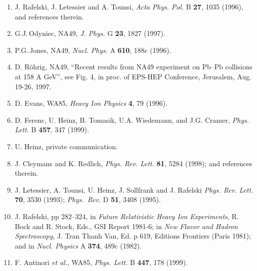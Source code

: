 \begin{mdframed}[linecolor=gray,roundcorner=12pt,backgroundcolor=Dandelion!15,linewidth=1pt,leftmargin=0cm,rightmargin=0cm,topline=true,bottomline=true,skipabove=12pt]
{\begin{enumerate}
\item%
{J. Rafelski, J. Letessier and A. Tounsi},
{\it Acta Phys. Pol.} B {\bf 27}, 1035 (1996), and references therein.

\item%
G.J.\,Odyniec, NA49, 
{\it J. Phys.} G {\bf 23}, 1827 (1997).

\item%
P.G.\,Jones, NA49, 
{\it Nucl. Phys.} A {\bf 610}, 188c (1996).

\item%
D. R\"ohrig, NA49,
``Recent results from NA49 experiment on Pb--Pb collisions at 158 A GeV'',
see Fig. 4, in proc. of EPS-HEP Conference, Jerusalem, Aug. 19-26, 1997.


\item%
D. Evans, WA85,
{\it Heavy Ion Physics} {\bf 4}, 79 (1996).

\item%
D. Ferenc, U. Heinz, B. Tomasik, U.A. Wiedemann, and J.G. Cramer,
{\it Phys. Lett.} B {\bf 457}, 347 (1999).

\item%
U. Heinz, private communication.

\item%
J. Cleymans and K. Redlich, {\it Phys. Rev. Lett.} {\bf 81}, 5284 (1998);
and references therein.

\item%
J. Letessier, A. Tounsi, U. Heinz, J. Sollfrank and J. Rafelski
{\it Phys. Rev. Lett.} {\bf 70}, 3530 (1993); 
{\it Phys.\ Rev.} D {\bf 51}, 3408 (1995).

\item%
J. Rafelski, pp 282--324, in 
{\it Future Relativistic Heavy Ion Experiments}, 
R. Bock and R. Stock, Eds., GSI Report 1981-6; 
in {\it New Flavor and Hadron Spectroscopy},
 J. Tran Thanh Van, Ed. p 619, Editions Frontiers (Paris 1981);
and in {\it Nucl. Physics} A {\bf 374}, 489c (1982).

\item%
F. Antinori {\it et al.}, WA85,
{\it Phys. Lett.} B {\bf 447}, 178 (1999).


\end{enumerate}}
\end{mdframed}
